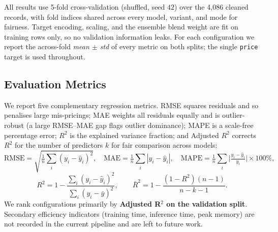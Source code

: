 All results use 5-fold cross-validation (shuffled, seed $42$) over the 4,086
cleaned records, with fold indices shared across every model, variant, and mode
for fairness. Target encoding, scaling, and the ensemble blend weight are fit on
training rows only, so no validation information leaks. For each configuration we
report the across-fold \emph{mean $\pm$ std} of every metric on both splits; the
single \texttt{price} target is used throughout.

\subsection{Evaluation Metrics}

We report five complementary regression metrics. RMSE squares residuals and so
penalises large mis-pricings; MAE weights all residuals equally and is
outlier-robust (a large RMSE--MAE gap flags outlier dominance); MAPE is a
scale-free percentage error; $R^2$ is the explained variance fraction; and
Adjusted $R^2$ corrects $R^2$ for the number of predictors $k$ for fair
comparison across models:
\begin{equation}
  \text{RMSE} = \sqrt{\tfrac{1}{n}\textstyle\sum_i(y_i - \hat{y}_i)^2},\quad
  \text{MAE} = \tfrac{1}{n}\textstyle\sum_i|y_i - \hat{y}_i|,\quad
  \text{MAPE} = \tfrac{1}{n}\textstyle\sum_i\big|\tfrac{y_i - \hat{y}_i}{y_i}\big|\times 100\%,
\end{equation}
\begin{equation}
  R^2 = 1 - \frac{\sum_i(y_i-\hat{y}_i)^2}{\sum_i(y_i-\bar{y})^2},\qquad
  \bar{R}^2 = 1 - \frac{(1-R^2)(n-1)}{n-k-1}.
\end{equation}
We rank configurations primarily by \textbf{Adjusted R$^2$ on the validation split}.
Secondary efficiency indicators (training time, inference time, peak memory) are not
recorded in the current pipeline and are left to future work.
